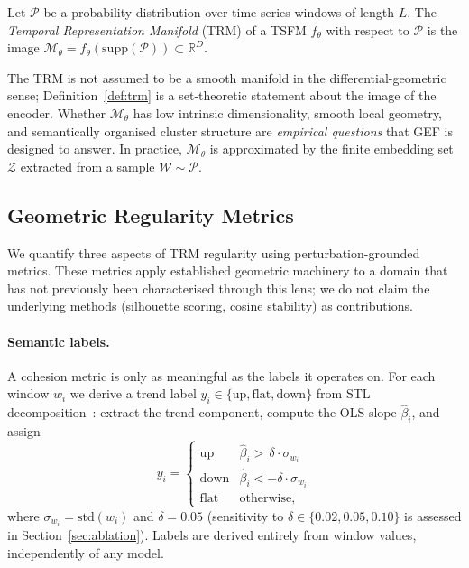 \begin{definition}
\label{def:trm}
Let $\mathcal{P}$ be a probability distribution over time series windows of length
$L$. The \emph{Temporal Representation Manifold} (TRM) of a TSFM $f_\theta$ with
respect to $\mathcal{P}$ is the image
$\mathcal{M}_\theta = f_\theta(\mathrm{supp}(\mathcal{P})) \subset \mathbb{R}^D$.
\end{definition}

The TRM is not assumed to be a smooth manifold in the differential-geometric sense;
Definition~\ref{def:trm} is a set-theoretic statement about the image of the encoder.
Whether $\mathcal{M}_\theta$ has low intrinsic dimensionality, smooth local geometry,
and semantically organised cluster structure are \emph{empirical questions} that
GEF is designed to answer.
In practice, $\mathcal{M}_\theta$ is approximated by the finite embedding set
$\mathcal{Z}$ extracted from a sample $\mathcal{W} \sim \mathcal{P}$.

\subsection{Geometric Regularity Metrics}
\label{sec:regularity}

We quantify three aspects of TRM regularity using perturbation-grounded metrics.
These metrics apply established geometric machinery to a domain that has not
previously been characterised through this lens; we do not claim the underlying
methods (silhouette scoring, cosine stability) as contributions.

\paragraph{Semantic labels.}
A cohesion metric is only as meaningful as the labels it operates on.
For each window $w_i$ we derive a trend label
$y_i \in \{\mathrm{up}, \mathrm{flat}, \mathrm{down}\}$ from STL
decomposition~\cite{cleveland1990stl}: extract the trend component,
compute the OLS slope $\hat\beta_i$, and assign
\begin{equation}
  y_i =
  \begin{cases}
    \mathrm{up}   & \hat\beta_i >  \,\delta \cdot \sigma_{w_i} \\
    \mathrm{down} & \hat\beta_i < -\delta \cdot \sigma_{w_i} \\
    \mathrm{flat} & \text{otherwise,}
  \end{cases}
  \label{eq:stl_label}
\end{equation}
where $\sigma_{w_i} = \mathrm{std}(w_i)$ and $\delta = 0.05$ (sensitivity to
$\delta \in \{0.02, 0.05, 0.10\}$ is assessed in Section~\ref{sec:ablation}).
Labels are derived entirely from window values, independently of any model.

